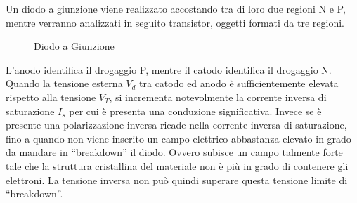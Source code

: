 \documentclass{article}
\numberwithin{equation}{subsection}
\begin{document}
Un diodo a giunzione viene realizzato accostando tra di loro due regioni N e P, mentre verranno analizzati in seguito transistor, oggetti formati da tre regioni. 
\begin{figure}[H]%
    \centering
    \qquad
    \caption{Diodo a Giunzione}
    \label{fig:diodo-giunzione}
\end{figure}
L'anodo identifica il drogaggio P, mentre il catodo identifica il drogaggio N. 
Quando la tensione esterna $V_d$ tra catodo ed anodo è sufficientemente elevata rispetto alla tensione $V_T$, si incrementa notevolmente la corrente 
inversa di saturazione $I_s$ per cui è presenta una conduzione significativa. 
Invece se è presente una polarizzazione inversa ricade nella corrente inversa di saturazione, fino a quando non viene inserito un campo elettrico 
abbastanza elevato in grado da mandare in ``breakdown'' il diodo. Ovvero subisce un campo talmente forte tale che la struttura cristallina del materiale 
non è più in grado di contenere gli elettroni.  
La tensione inversa non può quindi superare questa tensione limite di ``breakdown''. 
\end{document}
